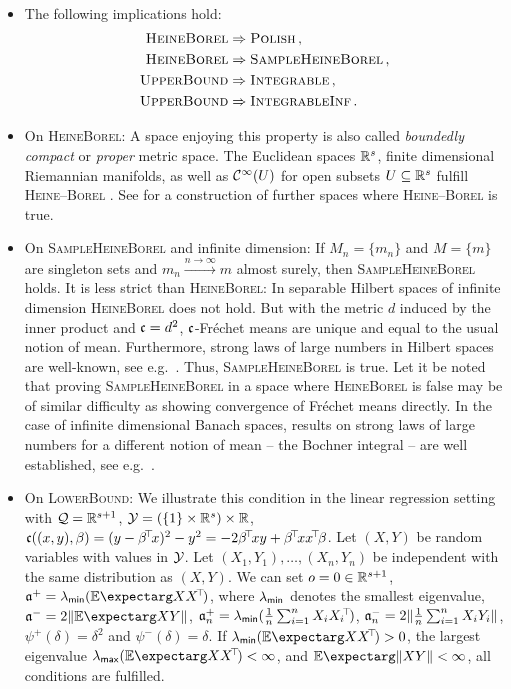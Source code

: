 %
\begin{remark}\label{rem:on_ass1}\mbox{ }
\begin{itemize}
\item 
	The following implications hold:
	\begin{align*}
	\textsc{HeineBorel} &\Rightarrow \textsc{Polish}\, ,\\
	\textsc{HeineBorel} &\Rightarrow \textsc{SampleHeineBorel}\, ,\\
	\textsc{UpperBound} &\Rightarrow \textsc{Integrable}\, ,\\
	\textsc{UpperBound} &\Rightarrow \textsc{IntegrableInf}\, .
	\end{align*}
\item On \textsc{HeineBorel}:
	A space enjoying this property is also called \textit{boundedly compact} or \textit{proper} metric space.
	The Euclidean spaces $\mathbb{R}^s$, finite dimensional Riemannian manifolds, as well as $\mathcal{C}^\infty(U)$ for open subsets $U \subseteq \mathbb{R}^s$  fulfill \textsc{Heine--Borel} \cite[section 8.4.7]{edwards95}.
	See \cite{williamson87} for a construction of further spaces where \textsc{Heine--Borel} is true. 
\item On \textsc{SampleHeineBorel} and infinite dimension:
	If $M_n=\{m_n\}$ and $M=\{m\}$ are singleton sets and $m_n \xrightarrow{n\to\infty} m$ almost surely, then \textsc{SampleHeineBorel} holds. It is less strict than \textsc{HeineBorel}: In separable Hilbert spaces of infinite dimension \textsc{HeineBorel} does not hold. But with the metric $d$ induced by the inner product and $\mathfrak{c}=d^2$, $\mathfrak{c}$-Fréchet means are unique and equal to the usual notion of mean. Furthermore, strong laws of large numbers in Hilbert spaces are well-known, see e.g.\ \cite{kawabe86}. Thus, \textsc{SampleHeineBorel} is true. Let it be noted that proving \textsc{SampleHeineBorel} in a space where \textsc{HeineBorel} is false may be of similar difficulty as showing convergence of Fréchet means directly. In the case of infinite dimensional Banach spaces, results on strong laws of large numbers for a different notion of mean -- the Bochner integral -- are well established, see e.g.\ \cite{hoffmann76}.
\item On \textsc{LowerBound}:
	We illustrate this condition in the linear regression setting with $\mathcal{Q} = \mathbb{R}^{s+1}$, $\mathcal{Y} = (\{1\}\times\mathbb{R}^s) \times \mathbb{R}$, $\mf c((x,y),\beta) = (y - \beta\tr x)^2 - y^2 = - 2 \beta\tr x y + \beta\tr xx\tr \beta$. Let $(X, Y)$ be random variables with values in $\mathcal{Y}$. Let $(X_1, Y_1),\dots, (X_n, Y_n)$ be independent with the same distribution as $(X,Y)$. We can set $o = 0\in\mathbb{R}^{s+1}$, $\mf a^+ = \lambda_{\ms{min}}(\Ex{XX\tr})$, where $\lambda_{\mathsf{min}}$ denotes the smallest eigenvalue, $\mf a^- = 2 \normof{\Ex{XY}}$, $\mathfrak{a}^+_n = \lambda_{\mathsf{min}}(\frac1n \sum_{i=1}^n X_iX_i\!^\top\!)$, $\mathfrak{a}^-_n = 2 \Vert \frac1n\sum_{i=1}^n X_iY_i \Vert$, $\psi^+(\delta) = \delta^2$ and $\psi^-(\delta) = \delta$. If $\lambda_{\ms{min}}(\Ex{XX\tr}) > 0$, the largest eigenvalue $\lambda_{\ms{max}}(\Ex{XX\tr}) < \infty$, and $\Ex{\normof{XY}} < \infty$, all conditions are fulfilled.
	

\end{itemize}
\end{remark}

